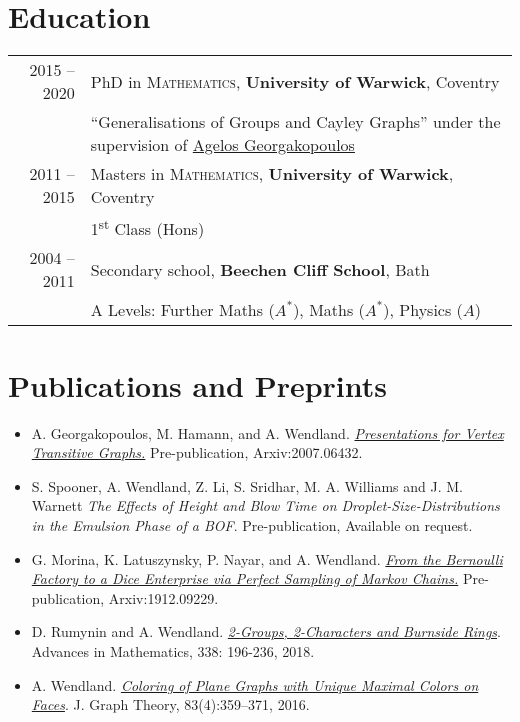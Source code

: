 \documentclass[a4paper,10pt]{article}
\begin{document}
\section{Education}
\begin{tabular}{rl}	
\textsc{} 2015 -- 2020 \hspace{-0.12cm} & PhD in \textsc{Mathematics}, \textbf{University of Warwick}, Coventry\\
& ``Generalisations of Groups and Cayley Graphs'' under the supervision of \href{https://homepages.warwick.ac.uk/~maslar/}{Agelos Georgakopoulos}\\
\textsc{} 2011 -- 2015& Masters in \textsc{Mathematics}, \textbf{University of Warwick}, Coventry\\
& 1\textsuperscript{st} Class (Hons)\\
\textsc{} 2004 -- 2011& Secondary school, \textbf{Beechen Cliff School}, Bath\\
&  A Levels: Further Maths ($A^{\ast}$), Maths ($A^{\ast}$), Physics ($A$)\\
\end{tabular}


\section{Publications and Preprints}
\begin{itemize}
	\item
	A. Georgakopoulos, M. Hamann, and A. Wendland. \href{https://arxiv.org/abs/2007.06432}{\emph{Presentations for Vertex Transitive Graphs.}} Pre-publication, Arxiv:2007.06432.
	\item 
	S. Spooner, A. Wendland, Z. Li, S. Sridhar, M. A. Williams and J. M. Warnett \emph{The Effects of Height and Blow Time on Droplet-Size-Distributions in the Emulsion Phase of a BOF}. Pre-publication, Available on request.
	\item 
	G. Morina, K. Latuszynsky, P. Nayar, and A. Wendland. \href{https://arxiv.org/abs/1912.09229}{\emph{From the Bernoulli Factory to a Dice Enterprise via Perfect Sampling of Markov Chains.}} Pre-publication, Arxiv:1912.09229.
	\item
	D. Rumynin and A. Wendland. \href{https://www.sciencedirect.com/science/article/pii/S0001870818303347}{\emph{2-Groups, 2-Characters and Burnside Rings}}. Advances in Mathematics, 338: 196-236, 2018.
	\item
	A. Wendland. \href{http://onlinelibrary.wiley.com/doi/10.1002/jgt.22002/abstract}{\emph{Coloring of Plane Graphs with Unique Maximal Colors on Faces}}. J. Graph Theory, 83(4):359–371, 2016.
\end{itemize}
\end{document}
